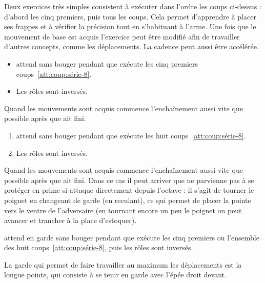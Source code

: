 Deux exercices très simples consistent à exécuter dans l'ordre les coups ci-dessus : d'abord les cinq premiers, puis tous les coups.
Cela permet d'apprendre à placer ses frappes et à vérifier la précision tout en s'habituant à l'arme.
Une fois que le mouvement de base est acquis l'exercice peut être modifié afin de travailler d'autres concepts, comme les déplacements.
La cadence peut aussi être accélérée.


\begin{exercice}


\begin{itemize}
	\item \D attend sans bouger pendant que \A exécute les cinq premiers coups~\ref{att:coup:série-8}.
	
	\item Les rôles sont inversés.
\end{itemize}

Quand les mouvements sont acquis \D commence l'enchaînement aussi vite que possible après que \A ait fini.
\end{exercice}


\begin{exercice}


\begin{enumerate}
	\item \D attend sans bouger pendant que \A exécute les huit coups~\ref{att:coup:série-8}.
	
	\item Les rôles sont inversés.
\end{enumerate}

Quand les mouvements sont acquis \D commence l'enchaînement aussi vite que possible après que \A ait fini.
Dans ce cas il peut arriver que \A ne parvienne pas à se protéger en prime si \D attaque directement depuis l'octave : il s'agit de tourner le poignet en changeant de garde (en reculant), ce qui permet de placer la pointe vers le ventre de l'adversaire (en tournant encore un peu le poignet on peut avancer et trancher à la place d'estoquer).
\end{exercice}


\begin{exercice}


\D attend en garde sans bouger pendant que \A exécute les cinq premiers ou l'ensemble des huit coups~\ref{att:coup:série-8}, puis les rôles sont inversés.

La garde qui permet de faire travailler au maximum les déplacements est la longue pointe, qui consiste à se tenir en garde avec l'épée droit devant.

\end{exercice}


